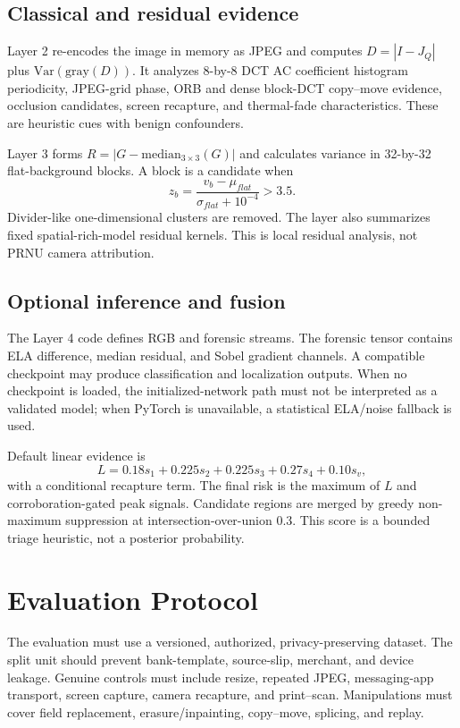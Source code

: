 \documentclass[conference]{IEEEtran}
\begin{document}
\subsection{Classical and residual evidence}
Layer 2 re-encodes the image in memory as JPEG and computes
$D=|I-J_Q|$ plus $\mathrm{Var}(\mathrm{gray}(D))$. It analyzes 8-by-8 DCT AC
coefficient histogram periodicity, JPEG-grid phase, ORB and dense block-DCT
copy--move evidence, occlusion candidates, screen recapture, and thermal-fade
characteristics. These are heuristic cues with benign confounders.

Layer 3 forms $R=|G-\mathrm{median}_{3\times3}(G)|$ and calculates variance in
32-by-32 flat-background blocks. A block is a candidate when
\begin{equation}
z_b=\frac{v_b-\mu_{flat}}{\sigma_{flat}+10^{-4}}>3.5.
\end{equation}
Divider-like one-dimensional clusters are removed. The layer also summarizes
fixed spatial-rich-model residual kernels. This is local residual analysis, not
PRNU camera attribution.

\subsection{Optional inference and fusion}
The Layer 4 code defines RGB and forensic streams. The forensic tensor contains
ELA difference, median residual, and Sobel gradient channels. A compatible
checkpoint may produce classification and localization outputs. When no
checkpoint is loaded, the initialized-network path must not be interpreted as a
validated model; when PyTorch is unavailable, a statistical ELA/noise fallback
is used.

Default linear evidence is
\begin{equation}
L=0.18s_1+0.225s_2+0.225s_3+0.27s_4+0.10s_v,
\end{equation}
with a conditional recapture term. The final risk is the maximum of $L$ and
corroboration-gated peak signals. Candidate regions are merged by greedy
non-maximum suppression at intersection-over-union 0.3. This score is a bounded
triage heuristic, not a posterior probability.

\section{Evaluation Protocol}
\label{sec:evaluation}
The evaluation must use a versioned, authorized, privacy-preserving dataset. The
split unit should prevent bank-template, source-slip, merchant, and device
leakage. Genuine controls must include resize, repeated JPEG, messaging-app
transport, screen capture, camera recapture, and print--scan. Manipulations must
cover field replacement, erasure/inpainting, copy--move, splicing, and replay.
\end{document}
